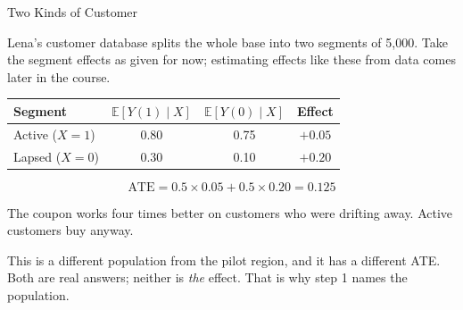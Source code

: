 \documentclass[aspectratio=169, 11pt, handout]{beamer}
\newcommand{\E}{\mathbb{E}}
\newcommand{\ATE}{\text{ATE}}
\begin{document}
\begin{frame}{Two Kinds of Customer}

Lena's customer database splits the whole base into two segments of 5{,}000. Take the segment effects as given for now; estimating effects like these from data comes later in the course.

\bigskip

\begin{center}
\begin{tabular}{lccc}
\toprule
\textbf{Segment} & $\E[Y(1) \mid X]$ & $\E[Y(0) \mid X]$ & \textbf{Effect} \\
\midrule
Active ($X = 1$) & 0.80 & 0.75 & $+0.05$ \\
Lapsed ($X = 0$) & 0.30 & 0.10 & $+0.20$ \\
\bottomrule
\end{tabular}
\end{center}

\[
\ATE = 0.5 \times 0.05 + 0.5 \times 0.20 = \mathbf{0.125}
\]

The coupon works four times better on customers who were drifting away. Active customers buy anyway.

\bigskip

\small This is a different population from the pilot region, and it has a different ATE. Both are real answers; neither is \emph{the} effect. That is why step 1 names the population.
\end{frame}
\end{document}
